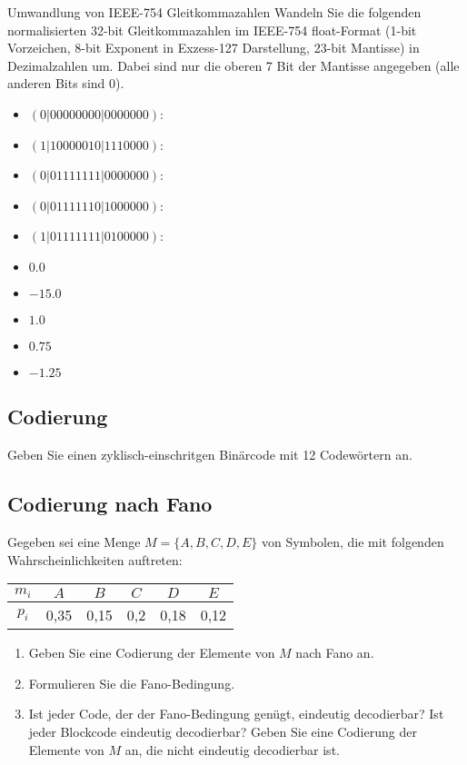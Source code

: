 \documentclass{exercisesheet}
\begin{document}
\begin{exercise*}[4]{Umwandlung von IEEE-754 Gleitkommazahlen}
  Wandeln Sie die folgenden normalisierten 32-bit Gleitkommazahlen im IEEE-754 float-Format (1-bit Vorzeichen, 8-bit Exponent in Exzess-127 Darstellung, 23-bit Mantisse) in Dezimalzahlen um. Dabei sind nur die oberen 7 Bit der Mantisse angegeben (alle anderen Bits sind 0).
  \begin{itemize}
    \item $(0|0000 0000|0000 000)$:
    \item $(1|1000 0010|1110 000)$:
    \item $(0|0111 1111|0000 000)$:
    \item $(0|0111 1110|1000 000)$:
    \item $(1|0111 1111|0100 000)$:
  \end{itemize}
\end{exercise*}

\begin{solution*}
  \begin{itemize}
    \item $0.0$
    \item $-15.0$
    \item $1.0$
    \item $0.75$
    \item $-1.25$
  \end{itemize}
\end{solution*}


\subsection{Codierung}
Geben Sie einen zyklisch-einschritgen Binärcode mit 12 Codewörtern an.

\subsection{Codierung nach Fano}
Gegeben sei eine Menge $M = \{A, B, C, D, E\}$ von Symbolen, die mit folgenden Wahrscheinlichkeiten auftreten:
\begin{center}
  \begin{tabular}{c|ccccc}
    $m_i$ & $A$  & $B$  & $C$ & $D$  & $E$  \\
    \hline
    $p_i$ & 0,35 & 0,15 & 0,2 & 0,18 & 0,12 \\
  \end{tabular}
\end{center}
\begin{enumerate}
  \item\label{fano:1} Geben Sie eine Codierung der Elemente von $M$ nach Fano an.
  \item Formulieren Sie die Fano-Bedingung.
  \item Ist jeder Code, der der Fano-Bedingung genügt, eindeutig decodierbar? Ist jeder Blockcode eindeutig decodierbar? Geben Sie eine Codierung der Elemente von $M$ an, die nicht eindeutig decodierbar ist.
\end{enumerate}
\end{document}
